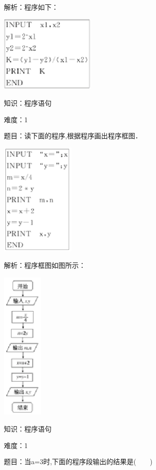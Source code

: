 \documentclass{article} %
\begin{document}
解析：程序如下：

\includegraphics*[width=1.86in, height=1.51in, keepaspectratio=false]{image41}

知识：程序语句

难度：1

题目：读下面的程序,根据程序画出程序框图．

\textit{\includegraphics*[width=1.45in, height=2.22in, keepaspectratio=false]{image42}}

解析：程序框图如图所示：

\includegraphics*[width=0.79in, height=2.96in, keepaspectratio=false]{image43}





知识：程序语句

难度：1

题目：当a=3时,下面的程序段输出的结果是(　　)
\end{document}

